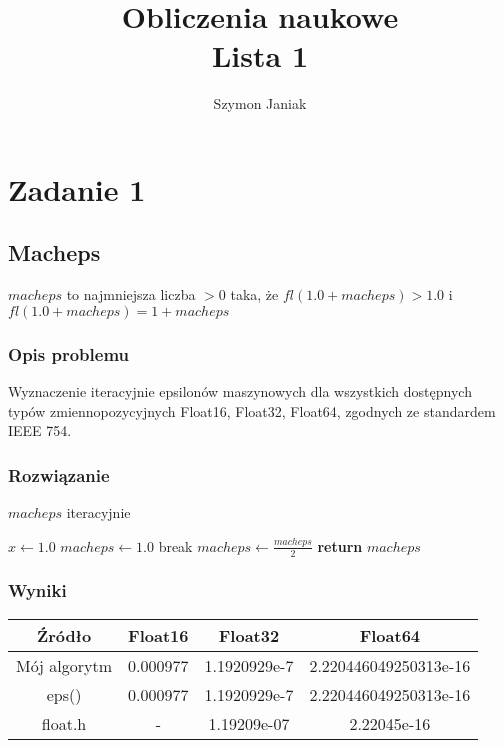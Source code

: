 \documentclass{article}
\title{%
	Obliczenia naukowe \\
	\large Lista 1}
\author{Szymon Janiak}
\begin{document}
\maketitle

\section{Zadanie 1}
\subsection{Macheps}
	$macheps$ to najmniejsza liczba $> 0$ taka, że $fl(1.0 + macheps) > 1.0$ i $fl(1.0 + macheps) = 1 + macheps$
\subsubsection{Opis problemu}
	Wyznaczenie iteracyjnie epsilonów maszynowych dla wszystkich dostępnych typów zmiennopozycyjnych Float16, Float32, Float64, zgodnych ze standardem IEEE 754.
\subsubsection{Rozwiązanie}
	\begin{algorithm}
	\caption{$macheps$ iteracyjnie}\label{alg:cap}
	\begin{algorithmic}
        \State $x \gets 1.0$
        \State $macheps \gets 1.0$
            	\State break
            \EndIf
            \State $macheps \gets \frac{macheps}{2}$
        \EndFor
        \State \textbf{return} $macheps$
    \end{algorithmic}
    \end{algorithm}

\subsubsection{Wyniki}
	\begin{center}
        \begin{tabular}{|c||c|c|c|}
        \hline
            Źródło & Float16 & Float32 & Float64 \\
            \hline\hline
            Mój algorytm & 0.000977 & 1.1920929e-7 & 2.220446049250313e-16\\
            \hline
            eps() & 0.000977 & 1.1920929e-7 & 2.220446049250313e-16\\
            \hline
            float.h & - & 1.19209e-07 & 2.22045e-16 \\
        \hline
        \end{tabular}
    \end{center}
\end{document}
